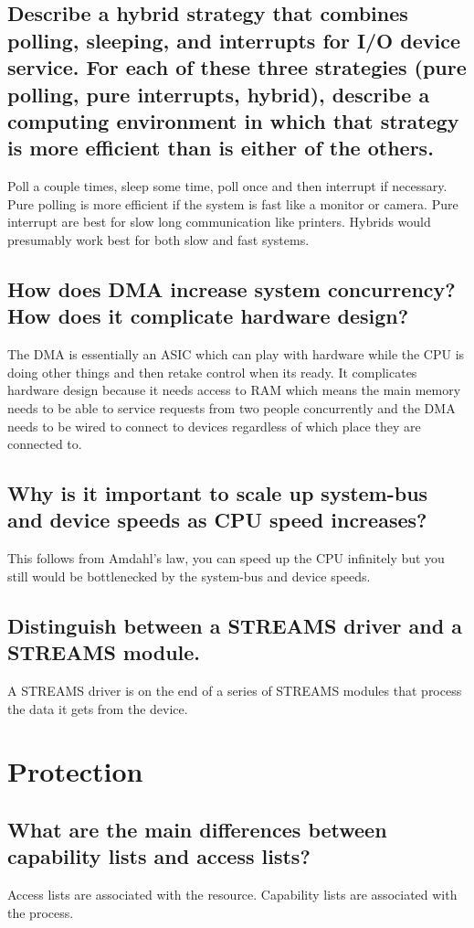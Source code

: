 \documentclass{book}%
\begin{document}
\section{Describe a hybrid strategy that combines polling, sleeping, and
interrupts for I/O device service. For each of these three strategies (pure
polling, pure interrupts, hybrid), describe a computing environment in which
that strategy is more efficient than is either of the others.}
Poll a couple times, sleep some time, poll once and then interrupt if necessary.
Pure polling is more efficient if the system is fast like a monitor or camera.
Pure interrupt are  best for slow long communication like printers.
Hybrids would presumably work best for both slow and fast systems.
\section{How does DMA increase system concurrency? How does it complicate
hardware design?} 
The DMA is essentially an ASIC which can play with hardware while the CPU is
doing other things and then retake control when its ready. It complicates
hardware design because it needs access to RAM which means the main memory
needs to be able to service requests from two people concurrently and the DMA
needs to be wired to connect to devices regardless of which place they are
connected to.
\section{Why is it important to scale up system-bus and device speeds as CPU
speed increases?}
This follows from Amdahl's law, you can speed up the CPU infinitely but you
still would be bottlenecked by the system-bus and device speeds.
\section{Distinguish between a STREAMS driver and a STREAMS module.}
A STREAMS driver is on the end of a series of STREAMS modules that process the
data it gets from the device.
\chapter{Protection}
\section{What are the main differences between capability lists and access
lists?}
Access lists are associated with the resource. Capability lists are associated
with the process.
\end{document}
